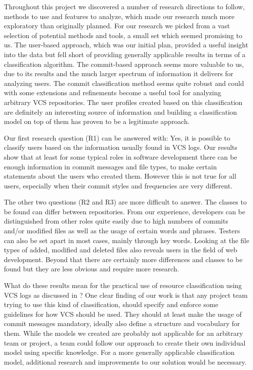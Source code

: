 Throughout this project we discovered a number of research directions to follow, methods to use and features to analyze, which made our research much more exploratory than originally planned. For our research we picked from a vast selection of potential methods and tools, a small set which seemed promising to us. %
The user-based approach, which was our initial plan, provided a useful insight into the data but fell short of providing generally applicable results in terms of a classification algorithm. The commit-based approach seems more valuable to us, due to its results and the much larger spectrum of information it delivers for analyzing users. The commit classification method seems quite robust and could with some extensions and refinements become a useful tool for analyzing arbitrary VCS repositories. The user profiles created based on this classification are definitely an interesting source of information and building a classification model on top of them has proven to be a legitimate approach. 

Our first research question (R1) can be answered with: Yes, it is possible to classify users based on the information usually found in VCS logs. Our results show that at least for some typical roles in software development there can be enough information in commit messages and file types, to make certain statements about the users who created them. However this is not true for all users, especially when their commit styles and frequencies are very different.

The other two questions (R2 and R3) are more difficult to answer. The classes to be found can differ between repositories. From our experience, developers can be distinguished from other roles quite easily due to high numbers of commits and/or modified files as well as the usage of certain words and phrases. Testers can also be set apart in most cases, mainly through key words. Looking at the file types of added, modified and deleted files also reveals users in the field of web development. Beyond that there are certainly more differences and classes to be found but they are less obvious and require more research.

What do these results mean for the practical use of resource classification using VCS logs as discussed in ? One clear finding of our work is that any project team trying to use this kind of classification, should specify and enforce some guidelines for how VCS should be used. They should at least make the usage of commit messages mandatory, ideally also define a structure and vocabulary for them. While the models we created are probably not applicable for an arbitrary team or project, a team could follow our approach to create their own individual model using specific knowledge. For a more generally applicable classification model, additional research and improvements to our solution would be necessary. 

